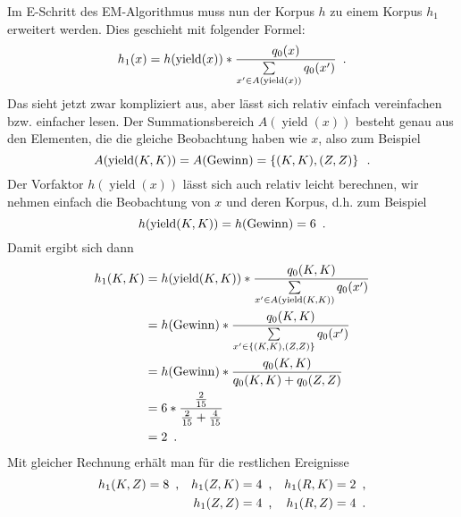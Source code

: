\documentclass[ngerman, a4paper, 12pt]{article}
\DeclareMathOperator{\yield}{yield}
\DeclareMathOperator{\win}{Gewinn}
\newcommand{\satzende}{\enskip \text{.}}
\newcommand{\komma}{\enskip \text{,}}
\begin{document}
\begin{enumerate}[label=\textbf{(\alph*)}, leftmargin=0pt]
	Im E-Schritt des EM-Algorithmus muss nun der Korpus $h$ zu einem Korpus $h_1$ erweitert werden. Dies geschieht mit folgender Formel:
	\begin{equation*}
		h_1(x) = h(\yield(x)) * \frac{q_0(x)}{\sum\limits_{x' \in A(\yield(x))} q_0(x')}
		\satzende
	\end{equation*}
	Das sieht jetzt zwar kompliziert aus, aber lässt sich relativ einfach vereinfachen bzw. einfacher lesen. Der Summationsbereich $A(\yield(x))$ besteht genau aus den Elementen, die die gleiche Beobachtung haben wie $x$, also zum Beispiel
	\begin{equation*}
		A(\yield(K,K)) = A(\win) = \menge{(K,K), (Z,Z)} \satzende
	\end{equation*}
	Der Vorfaktor $h(\yield(x))$ lässt sich auch relativ leicht berechnen, wir nehmen einfach die Beobachtung von $x$ und deren Korpus, d.h. zum Beispiel
	\begin{equation*}
		h(\yield(K,K)) = h(\win) = 6 \satzende
	\end{equation*}
	Damit ergibt sich dann
	\begin{align*}
		h_1(K,K) &= h(\yield(K,K)) * \frac{q_0(K,K)}{\sum\limits_{x' \in A(\yield(K,K))} q_0(x')} \\
		&= h(\win) * \frac{q_0(K,K)}{\sum\limits_{x' \in \menge{(K,K),(Z,Z)}} q_0(x')} \\
		&= h(\win) * \frac{q_0(K,K)}{q_0(K,K) + q_0(Z,Z)} \\
		&= 6 * \frac{\frac{2}{15}}{\frac{2}{15} + \frac{4}{15}} \\
		&= 2 \satzende
	\end{align*}
	Mit gleicher Rechnung erhält man für die restlichen Ereignisse
	\begin{align*}
		h_1(K,Z) &= 8 \komma & h_1(Z,K) &= 4 \komma & h_1(R,K) &= 2 \komma \\
				 &    & h_1(Z,Z) &= 4 \komma & h_1(R,Z) &= 4 \satzende
	\end{align*}
	


\end{enumerate}
\end{document}
